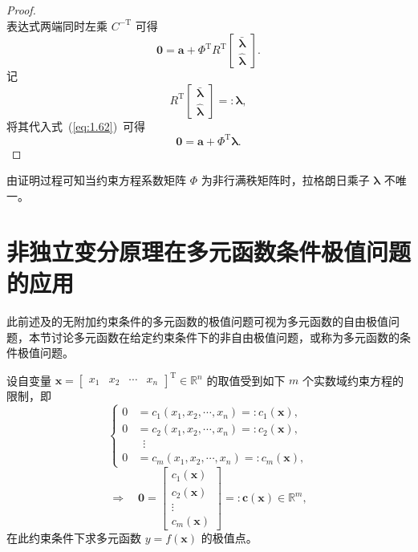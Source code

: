 \begin{proof}
\begin{equation}
\end{equation}
表达式两端同时左乘 $C^{-\mathrm{T}}$ 可得
\begin{equation}\label{eq:1.62}
\boldsymbol{0} = \boldsymbol{a} + \Phi^{\mathrm{T}} R^{\mathrm{T}} \!\begin{bmatrix} \bar{\boldsymbol{\lambda}} \\ \hat{\boldsymbol{\lambda}} \end{bmatrix}.
\end{equation}
记
\begin{equation}\label{eq:1.63}
R^{\mathrm{T}} \!\begin{bmatrix} \bar{\boldsymbol{\lambda}} \\ \hat{\boldsymbol{\lambda}} \end{bmatrix} =: \boldsymbol{\lambda},
\end{equation}
将其代入式~(\ref{eq:1.62})~可得
\begin{equation}\label{eq:1.64}
\boldsymbol{0} = \boldsymbol{a} + \Phi^{\mathrm{T}} \boldsymbol{\lambda}.
\end{equation}
\end{proof}

由证明过程可知当约束方程系数矩阵 $\Phi$ 为非行满秩矩阵时，拉格朗日乘子 $\boldsymbol{\lambda}$ 不唯一。

\section{非独立变分原理在多元函数条件极值问题的应用}

此前述及的无附加约束条件的多元函数的极值问题可视为多元函数的自由极值问题，本节讨论多元函数在给定约束条件下的非自由极值问题，或称为多元函数的条件极值问题。

设自变量 $\boldsymbol{x} = \begin{bmatrix} x_1 & x_2 & \cdots & x_n \end{bmatrix}^{\mathrm{T}} \in \mathbb{R}^n$ 的取值受到如下 $m$ 个实数域约束方程的限制，即
\begin{equation*}
\left\{
\begin{aligned}
0 &= c_1(x_1, x_2, \cdots, x_n) =: c_1(\boldsymbol{x}), \\
0 &= c_2(x_1, x_2, \cdots, x_n) =: c_2(\boldsymbol{x}), \\
&\;\;\vdots \\
0 &= c_m(x_1, x_2, \cdots, x_n) =: c_m(\boldsymbol{x}),
\end{aligned}
\right.
\end{equation*}
\begin{equation*}
\Rightarrow \quad \boldsymbol{0} = \begin{bmatrix} c_1(\boldsymbol{x}) \\ c_2(\boldsymbol{x}) \\ \vdots \\ c_m(\boldsymbol{x}) \end{bmatrix} =: \boldsymbol{c}(\boldsymbol{x}) \in \mathbb{R}^m,
\end{equation*}
在此约束条件下求多元函数 $y = f(\boldsymbol{x})$ 的极值点。

